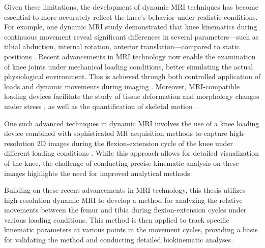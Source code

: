 \documentclass{micro-econ-thesis}
\begin{document}
Given these limitations, the development of dynamic MRI techniques has become essential to more accurately reflect the knee's behavior under realistic conditions. For example, one dynamic MRI study demonstrated that knee kinematics during continuous movement reveal significant differences in several parameters---such as tibial abduction, internal rotation, anterior translation---compared to static positions \parencite{dentremont_dynamicbased_2013}. Recent advancements in MRI technology now enable the examination of knee joints under mechanical loading conditions, better simulating the actual physiological environment. This is achieved through both controlled application of loads \parencite{jogi_device_2022} and dynamic movements during imaging \parencite{conconi_-vivo_2023}. Moreover, MRI-compatible loading devices facilitate the study of tissue deformation and morphology changes under stress \parencite{shimozaki_extrusion_2023}, as well as the quantification of skeletal motion \parencite{kaiser_measurement_2013}. 

One such advanced techniques in dynamic MRI involves the use of a knee loading device combined with sophisticated MR acquisition methods to capture high-resolution 2D images during the flexion-extension cycle of the knee under different loading conditions \autocites{brisson_novel_2022}{aleksiev_high-resolution_2022}. While this approach allows for detailed visualization of the knee, the challenge of conducting precise kinematic analysis on these images highlights the need for improved analytical methods.  

Building on these recent advancements in MRI technology, this thesis utilizes high-resolution dynamic MRI to develop a method for analyzing the relative movements between the femur and tibia during flexion-extension cycles under various loading conditions.  This method is then applied to track specific kinematic parameters at various points in the movement cycles, providing a basis for validating the method and conducting detailed biokinematic analyses.
\end{document}
